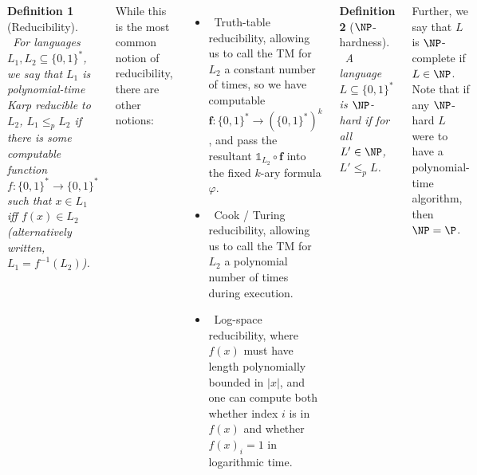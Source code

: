 \documentclass{tikzposter} %
\newtheorem{definition}{Definition}
\begin{document}
\begin{columns}
{  \begin{definition}[Reducibility]
    \ For languages $L_{1}, L_{2} \subseteq \{0,1\}^{*}$, we say that $L_{1}$ is polynomial-time Karp reducible to $L_{2}$, $L_{1} \le_{p} L_{2}$ if there is some computable function $f : \{0,1\}^{*} \to \{0,1\}^{*}$ such that $x \in L_{1}$ iff $f(x) \in L_{2}$ (alternatively written, $L_{1} = f^{-1}(L_{2})$).
  \end{definition}
  \hphantom{}

  While this is the most common notion of reducibility, there are other notions:
  \begin{itemize}
    \item \ Truth-table reducibility, allowing us to call the TM for $L_{2}$ a constant number of times, so we have computable $\bm{f} : \{0,1\}^{*} \to \left(\{0,1\}^{*}\right)^{k}$, and pass the resultant $\mathds{1}_{L_{2}} \circ \bm{f}$ into the fixed $k$-ary formula $\varphi$.
    \item \ Cook / Turing reducibility, allowing us to call the TM for $L_2$ a polynomial number of times during execution.
    \item \ Log-space reducibility, where $f(x)$ must have length polynomially bounded in $|x|$, and one can compute both whether index $i$ is in $f(x)$ and whether $f(x)_{i} = 1$ in logarithmic time. \\
  \end{itemize}

  \begin{definition}[$\NP$-hardness]
  \ A language $L \subseteq \{0,1\}^{*}$ is $\NP$-hard if for all $L' \in \NP$, $L' \le_{p} L$.
  \end{definition}
  \hphantom{}

  Further, we say that $L$ is $\NP$-complete if $L \in \NP$. Note that if any $\NP$-hard $L$ were to have a polynomial-time algorithm, then $\NP = \P$. \\

}
\end{columns}
\end{document}
